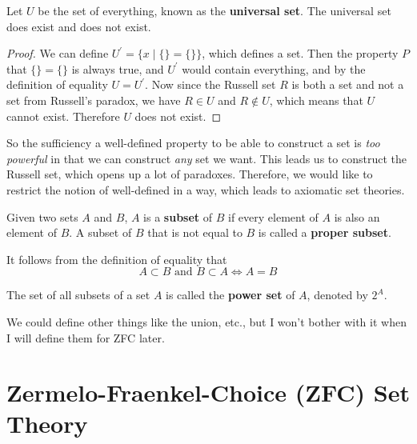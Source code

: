 \documentclass{article}
\begin{document}
  \begin{theorem}
    Let $U$ be the set of everything, known as the \textbf{universal set}. The universal set does exist and does not exist. 
  \end{theorem}
  \begin{proof}
    We can define $U^\prime = \{x \mid \{\} = \{\} \}$, which defines a set. Then the property $P$ that $\{\} = \{\}$ is always true, and $U^\prime$ would contain everything, and by the definition of equality $U = U^\prime$. Now since the Russell set $R$ is both a set and not a set from Russell's paradox, we have $R \in U$ and $R \not\in U$, which means that $U$ cannot exist. Therefore $U$ does not exist. 
  \end{proof}

  So the sufficiency a well-defined property to be able to construct a set is \textit{too powerful} in that we can construct \textit{any} set we want. This leads us to construct the Russell set, which opens up a lot of paradoxes. Therefore, we would like to restrict the notion of well-defined in a way, which leads to axiomatic set theories. 

  \begin{definition}[Subsets]
    Given two sets $A$ and $B$, $A$ is a \textbf{subset} of $B$ if every element of $A$ is also an element of $B$. A subset of $B$ that is not equal to $B$ is called a \textbf{proper subset}. 
  \end{definition}

  \begin{theorem}[Equality]
    It follows from the definition of equality that 
    \begin{equation}
      A \subset B \text{ and } B \subset A \iff A = B
    \end{equation}
  \end{theorem}

  \begin{definition}
    The set of all subsets of a set $A$ is called the \textbf{power set} of $A$, denoted by $2^A$. 
  \end{definition}

  We could define other things like the union, etc., but I won't bother with it when I will define them for ZFC later.  

\section{Zermelo-Fraenkel-Choice (ZFC) Set Theory} 
\end{document}
